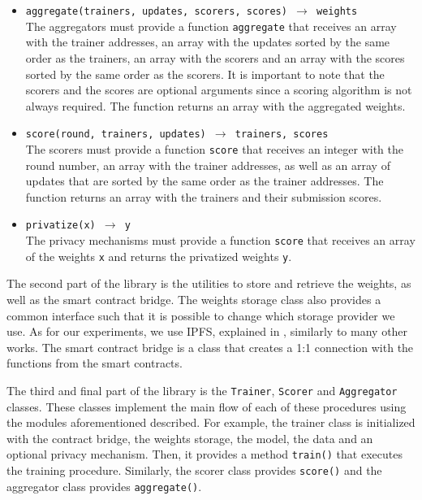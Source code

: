 \begin{itemize}
    \item \texttt{aggregate(trainers, updates, scorers, scores) $\rightarrow$ weights}\\
    The aggregators must provide a function \texttt{aggregate} that receives an array with the trainer addresses, an array with the updates sorted by the same order as the trainers, an array with the scorers and an array with the scores sorted by the same order as the scorers. It is important to note that the scorers and the scores are optional arguments since a scoring algorithm is not always required. The function returns an array with the aggregated weights. %
    
    \item \texttt{score(round, trainers, updates) $\rightarrow$ trainers, scores}\\
    The scorers must provide a function \texttt{score} that receives an integer with the round number, an array with the trainer addresses, as well as an array of updates that are sorted by the same order as the trainer addresses. The function returns an array with the trainers and their submission scores. %
    
    \item \texttt{privatize(x) $\rightarrow$ y}\\
    The privacy mechanisms must provide a function \texttt{score} that receives an array of the weights \texttt{x} and returns the privatized weights \texttt{y}. %
\end{itemize}

The second part of the library is the utilities to store and retrieve the weights, as well as the smart contract bridge. The weights storage class also provides a common interface such that it is possible to change which storage provider we use. As for our experiments, we use IPFS, explained in , similarly to many other works. The smart contract bridge is a class that creates a 1:1 connection with the functions from the smart contracts.

The third and final part of the library is the \texttt{Trainer}, \texttt{Scorer} and \texttt{Aggregator} classes. These classes implement the main flow of each of these procedures using the modules aforementioned described. For example, the trainer class is initialized with the contract bridge, the weights storage, the model, the data and an optional privacy mechanism. Then, it provides a method \texttt{train()} that executes the training procedure. Similarly, the scorer class provides \texttt{score()} and the aggregator class provides \texttt{aggregate()}.

